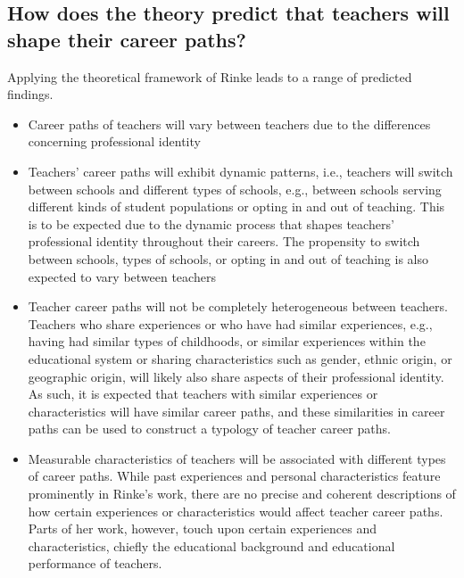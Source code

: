 \documentclass[
]{article}
\begin{document}
\hypertarget{how-does-the-theory-predict-that-teachers-will-shape-their-career-paths}{%
\subsection{How does the theory predict that teachers will shape their career paths?}\label{how-does-the-theory-predict-that-teachers-will-shape-their-career-paths}}

Applying the theoretical framework of Rinke leads to a range of predicted findings.

\begin{itemize}
\item
  Career paths of teachers will vary between teachers due to the differences concerning professional identity
\item
  Teachers' career paths will exhibit dynamic patterns, i.e., teachers will switch between schools and different types of schools, e.g., between schools serving different kinds of student populations or opting in and out of teaching. This is to be expected due to the dynamic process that shapes teachers' professional identity throughout their careers. The propensity to switch between schools, types of schools, or opting in and out of teaching is also expected to vary between teachers
\item
  Teacher career paths will not be completely heterogeneous between teachers. Teachers who share experiences or who have had similar experiences, e.g., having had similar types of childhoods, or similar experiences within the educational system or sharing characteristics such as gender, ethnic origin, or geographic origin, will likely also share aspects of their professional identity. As such, it is expected that teachers with similar experiences or characteristics will have similar career paths, and these similarities in career paths can be used to construct a typology of teacher career paths.
\item
  Measurable characteristics of teachers will be associated with different types of career paths. While past experiences and personal characteristics feature prominently in Rinke's work, there are no precise and coherent descriptions of how certain experiences or characteristics would affect teacher career paths. Parts of her work, however, touch upon certain experiences and characteristics, chiefly the educational background and educational performance of teachers.


\end{itemize}
\end{document}
